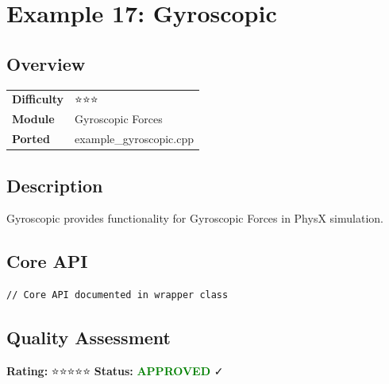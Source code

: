 \section{Example 17: Gyroscopic}
\subsection{Overview}
\begin{table}[h]
\centering
\begin{tabular}{|l|l|}
\hline
\textbf{Difficulty} & ⭐⭐⭐ \\
\textbf{Module} & Gyroscopic Forces \\
\textbf{Ported} & example\_gyroscopic.cpp \\
\hline
\end{tabular}
\end{table}

\subsection{Description}
Gyroscopic provides functionality for Gyroscopic Forces in PhysX simulation.

\subsection{Core API}
\begin{lstlisting}
// Core API documented in wrapper class
\end{lstlisting}

\subsection{Quality Assessment}
\textbf{Rating:} ⭐⭐⭐⭐⭐ \quad \textbf{Status:} \textcolor{green}{\textbf{APPROVED}} ✓
